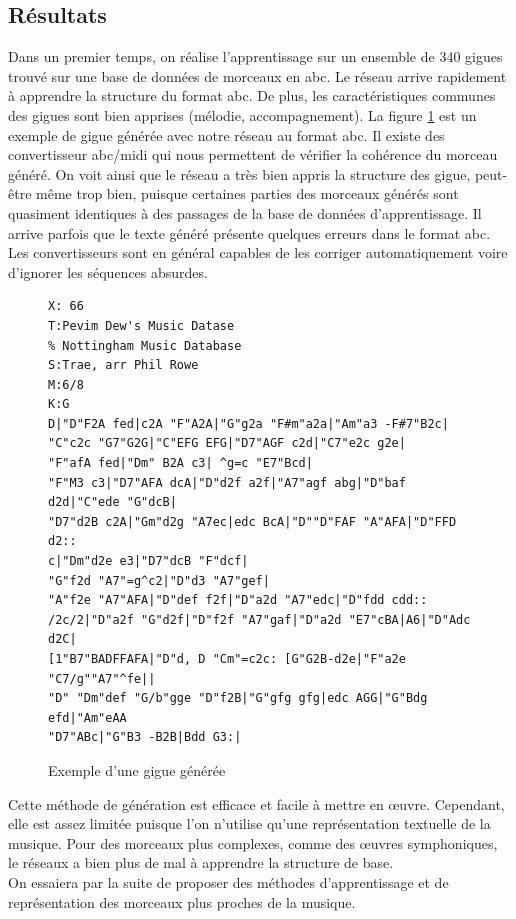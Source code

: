 \subsection{Résultats}
Dans un premier temps, on réalise l'apprentissage sur un ensemble de 340 gigues trouvé sur une base de données de morceaux en abc. Le réseau arrive rapidement à apprendre la structure du format abc. De plus, les caractéristiques communes des gigues sont bien apprises (mélodie, accompagnement). La figure \ref{jig_generee_abc} est un exemple de gigue générée avec notre réseau au format abc. Il existe des convertisseur abc/midi qui nous permettent de vérifier la cohérence du morceau généré. On voit ainsi que le réseau a très bien appris la structure des gigue, peut-être même trop bien, puisque certaines parties des morceaux générés sont quasiment identiques à des passages de la base de données d'apprentissage. Il arrive parfois que le texte généré présente quelques erreurs dans le format abc. Les convertisseurs sont en général capables de les corriger automatiquement voire d'ignorer les séquences absurdes.

\begin{figure}[!h]
\begin{verbatim}
X: 66
T:Pevim Dew's Music Datase
% Nottingham Music Database
S:Trae, arr Phil Rowe
M:6/8
K:G
D|"D"F2A fed|c2A "F"A2A|"G"g2a "F#m"a2a|"Am"a3 -F#7"B2c|
"C"c2c "G7"G2G|"C"EFG EFG|"D7"AGF c2d|"C7"e2c g2e|
"F"afA fed|"Dm" B2A c3| ^g=c "E7"Bcd|
"F"M3 c3|"D7"AFA dcA|"D"d2f a2f|"A7"agf abg|"D"baf d2d|"C"ede "G"dcB|
"D7"d2B c2A|"Gm"d2g "A7ec|edc BcA|"D""D"FAF "A"AFA|"D"FFD d2::
c|"Dm"d2e e3|"D7"dcB "F"dcf|
"G"f2d "A7"=g^c2|"D"d3 "A7"gef|
"A"f2e "A7"AFA|"D"def f2f|"D"a2d "A7"edc|"D"fdd cdd::
/2c/2|"D"a2f "G"d2f|"D"f2f "A7"gaf|"D"a2d "E7"cBA|A6|"D"Adc d2C|
[1"B7"BADFFAFA|"D"d, D "Cm"=c2c: [G"G2B-d2e|"F"a2e "C7/g""A7"^fe||
"D" "Dm"def "G/b"gge "D"f2B|"G"gfg gfg|edc AGG|"G"Bdg efd|"Am"eAA 
"D7"ABc|"G"B3 -B2B|Bdd G3:|
\end{verbatim}
\caption{Exemple d'une gigue générée}
\label{jig_generee_abc}
\end{figure}

Cette méthode de génération est efficace et facile à mettre en œuvre. Cependant, elle est assez limitée puisque l'on n'utilise qu'une représentation textuelle de la musique. Pour des morceaux plus complexes, comme des œuvres symphoniques, le réseaux a bien plus de mal à apprendre la structure de base. \\
On essaiera par la suite de proposer des méthodes d'apprentissage et de représentation des morceaux plus proches de la musique.

